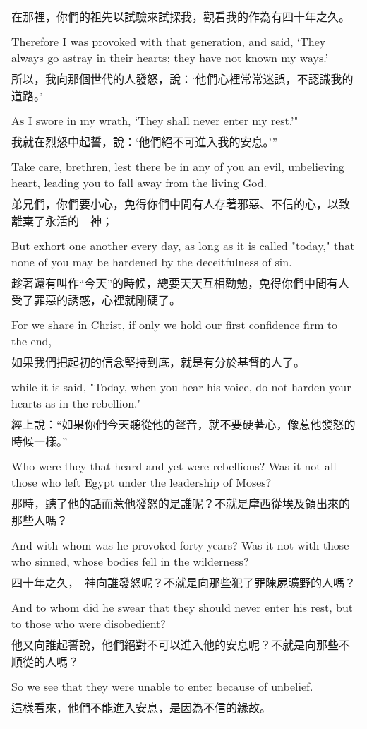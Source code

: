 \begin{tabularx}{\textwidth}{p{}}
在那裡，你們的祖先以試驗來試探我，觀看我的作為有四十年之久。 \\ \\
Therefore I was provoked with that generation, and said, `They always go astray in their hearts; they have not known my ways.' \\
所以，我向那個世代的人發怒，說：‘他們心裡常常迷誤，不認識我的道路。’ \\ \\
As I swore in my wrath, `They shall never enter my rest.'" \\
我就在烈怒中起誓，說：‘他們絕不可進入我的安息。’” \\ \\
Take care, brethren, lest there be in any of you an evil, unbelieving heart, leading you to fall away from the living God. \\
弟兄們，你們要小心，免得你們中間有人存著邪惡、不信的心，以致離棄了永活的　神； \\ \\
But exhort one another every day, as long as it is called "today," that none of you may be hardened by the deceitfulness of sin. \\
趁著還有叫作“今天”的時候，總要天天互相勸勉，免得你們中間有人受了罪惡的誘惑，心裡就剛硬了。 \\ \\
For we share in Christ, if only we hold our first confidence firm to the end, \\
如果我們把起初的信念堅持到底，就是有分於基督的人了。 \\ \\
while it is said, "Today, when you hear his voice, do not harden your hearts as in the rebellion." \\
經上說：“如果你們今天聽從他的聲音，就不要硬著心，像惹他發怒的時候一樣。” \\ \\
Who were they that heard and yet were rebellious? Was it not all those who left Egypt under the leadership of Moses? \\
那時，聽了他的話而惹他發怒的是誰呢？不就是摩西從埃及領出來的那些人嗎？ \\ \\
And with whom was he provoked forty years? Was it not with those who sinned, whose bodies fell in the wilderness? \\
四十年之久，　神向誰發怒呢？不就是向那些犯了罪陳屍曠野的人嗎？ \\ \\
And to whom did he swear that they should never enter his rest, but to those who were disobedient? \\
他又向誰起誓說，他們絕對不可以進入他的安息呢？不就是向那些不順從的人嗎？ \\ \\
So we see that they were unable to enter because of unbelief. \\
這樣看來，他們不能進入安息，是因為不信的緣故。 \\ \\

\hline
\end{tabularx}


